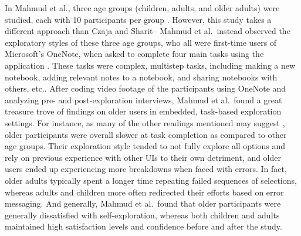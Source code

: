 \documentclass[12pt,twoside]{reedthesis}
\begin{document}
    In Mahmud et al.\@, three age groups (children, adults, and older adults) were studied, each with 10 participants per group \cite{mahmud_learning_2020}. However, this study takes a different approach than Czaja and Sharit-- Mahmud et al.~instead observed the exploratory styles of these three age groups, who all were first-time users of Microsoft's OneNote, when asked to complete four main tasks using the application \cite{mahmud_learning_2020, czaja_age_1993}. These tasks were complex, multistep tasks, including making a new notebook, adding relevant notes to a notebook, and sharing notebooks with others, etc.. After coding video footage of the participants using OneNote and analyzing pre- and post-exploration interviews, Mahmud et al.~found a great treasure trove of findings on older users in embedded, task-based exploration settings. For instance, as many of the other readings mentioned may suggest \cite{liu_study_2023, dosso_how_2021, grahame_age_2004}, older participants were overall slower at task completion as compared to other age groups. Their exploration style tended to not fully explore all options and rely on previous experience with other UIs to their own detriment, and older users ended up experiencing more breakdowns when faced with errors. In fact, older adults typically spent a longer time repeating failed sequences of selections, whereas adults and children more often redirected their efforts based on error messaging. And generally, Mahmud et al.~found that older participants were generally dissatisfied with self-exploration, whereas both children and adults maintained high satisfaction levels and confidence before and after the study. 
\end{document}
